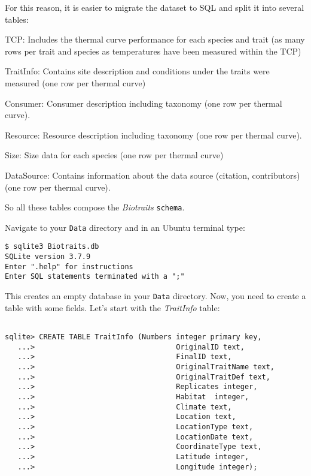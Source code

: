 		For this reason, it is easier to migrate the dataset to SQL and 
		split it into several tables:
    
    \begin{compactitem}
    \item TCP: Includes the thermal curve performance for each species and trait (as many rows per trait and species
      as temperatures have been measured within the TCP)
    \item TraitInfo: Contains site description and conditions under the traits were measured (one row per thermal curve)
    \item Consumer: Consumer description including taxonomy (one row per thermal curve).
    \item Resource: Resource description including taxonomy (one row per thermal curve).
    \item Size: Size data for each species (one row per thermal curve)
    \item DataSource: Contains information about the data source (citation, contributors) (one row per thermal curve).
    \end{compactitem}

    So all these tables compose the {\it Biotraits} {\tt schema}.

    Navigate to your {\tt Data} directory and in an Ubuntu terminal type:

\begin{lstlisting}
$ sqlite3 Biotraits.db
SQLite version 3.7.9
Enter ".help" for instructions
Enter SQL statements terminated with a ";"
\end{lstlisting}
This creates an empty database in your {\tt Data} directory. Now, you 
need to create a table with some fields. Let's start with the {\it TraitInfo} table:
\begin{lstlisting}
	
sqlite> CREATE TABLE TraitInfo (Numbers integer primary key,
   ...>                                 OriginalID text,
   ...>                                 FinalID text,
   ...>                                 OriginalTraitName text,
   ...>                                 OriginalTraitDef text,
   ...>                                 Replicates integer,
   ...>                                 Habitat  integer,               
   ...>                                 Climate text,
   ...>                                 Location text,
   ...>                                 LocationType text,
   ...>                                 LocationDate text,
   ...>                                 CoordinateType text,
   ...>                                 Latitude integer,
   ...>                                 Longitude integer);

\end{lstlisting}

